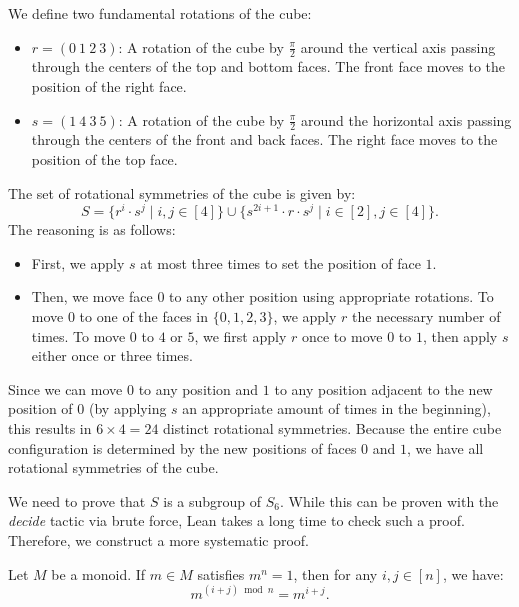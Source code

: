 \begin{definition}
  \label{def:rotationalSymmetriesOfCube}
  \leanok
  We define two fundamental rotations of the cube:
  \begin{itemize}
    \item $r = (0\ 1\ 2\ 3)$: A rotation of the cube by $\frac{\pi}{2}$ around the vertical axis passing through the centers of the top and bottom faces. The front face moves to the position of the right face.
    \item $s = (1\ 4\ 3\ 5)$: A rotation of the cube by $\frac{\pi}{2}$ around the horizontal axis passing through the centers of the front and back faces. The right face moves to the position of the top face.
  \end{itemize}

  The set of rotational symmetries of the cube is given by:
  \begin{equation*}
    S = \{r^i \cdot s^j \mid i, j \in [4]\} \cup \{s^{2i + 1} \cdot r \cdot s^j \mid i \in [2], j \in [4]\}.
  \end{equation*}
  The reasoning is as follows:
  \begin{itemize}
    \item First, we apply $s$ at most three times to set the position of face $1$.
    \item Then, we move face $0$ to any other position using appropriate rotations. To move $0$ to one of the faces in $\{0, 1, 2, 3\}$, we apply $r$ the necessary number of times. To move $0$ to $4$ or $5$, we first apply $r$ once to move $0$ to $1$, then apply $s$ either once or three times.
  \end{itemize}
  Since we can move $0$ to any position and $1$ to any position adjacent to the new position of $0$ (by applying $s$ an appropriate amount of times in the beginning), this results in $6 \times 4 = 24$ distinct rotational symmetries. Because the entire cube configuration is determined by the new positions of faces $0$ and $1$, we have all rotational symmetries of the cube.
\end{definition}

We need to prove that $S$ is a subgroup of $S_6$. While this can be proven with the \emph{decide} tactic via brute force, Lean takes a long time to check such a proof. Therefore, we construct a more systematic proof.

\begin{proposition}
  \label{prop:pow-add-val-eq-of-pow-eq-one}
  \leanok
  Let $M$ be a monoid. If $m \in M$ satisfies $m^n = 1$, then for any $i, j \in [n]$, we have:
  \begin{equation*}
    m^{(i + j) \bmod n} = m^{i + j}.
  \end{equation*}
\end{proposition}

